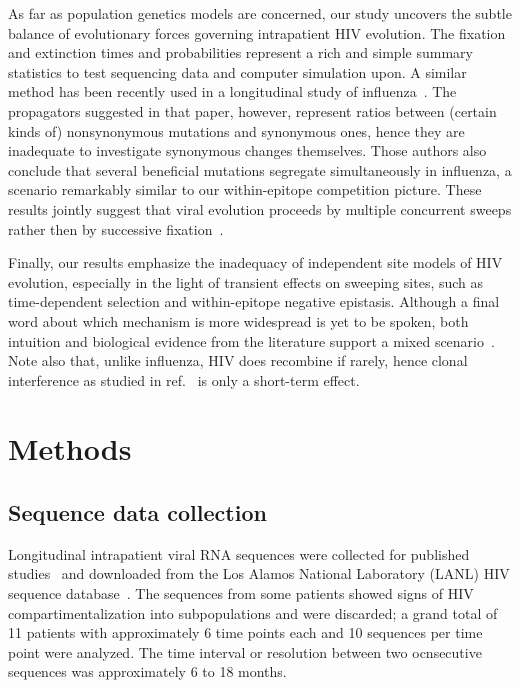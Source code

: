 \documentclass[rmp, twocolumn]{revtex4}
\begin{document}
As far as population genetics models are concerned, our study uncovers the
subtle balance of evolutionary forces governing intrapatient HIV evolution. The
fixation and extinction times and probabilities represent a rich and simple
summary statistics to test sequencing data and computer simulation upon. A
similar method has been recently used in a longitudinal study of
influenza~\citep{strelkowa_clonal_2012}. The propagators suggested in that
paper, however, represent ratios between (certain kinds of) nonsynonymous
mutations and synonymous ones, hence they are inadequate to investigate
synonymous changes themselves. Those authors also conclude that several
beneficial mutations segregate simultaneously in influenza, a scenario
remarkably similar to our within-epitope competition picture. These results
jointly suggest that viral evolution proceeds by multiple concurrent sweeps
rather then by successive fixation~\citep{desai_beneficial_2007, neher_rate_2010}.

Finally, our results emphasize the inadequacy of independent site
models of HIV evolution, especially in the light of transient effects on
sweeping sites, such as time-dependent selection and within-epitope negative
epistasis. Although a final word about which mechanism is more
widespread is yet to be spoken, both intuition and biological evidence from the
literature support a mixed scenario~\citep{richman_rapid_2003,
moore_limited_2009, bar_early_2012}. Note also that, unlike influenza, HIV does
recombine if rarely, hence clonal interference as studied in
ref.~\citep{strelkowa_clonal_2012} is only a short-term effect.

\section{Methods}
\subsection{Sequence data collection}
Longitudinal intrapatient viral RNA sequences were collected for published
studies~\citep{shankarappa_consistent_1999,
liu_selection_2006, bunnik_autologous_2008} and downloaded from the Los Alamos
National Laboratory (LANL) HIV sequence database~\citep{LANL2012}. The sequences from
some patients showed signs of HIV compartimentalization into subpopulations and
were discarded; a grand total of 11
patients with approximately 6 time points each and 10 sequences per time point
were analyzed. The time interval or resolution between two ocnsecutive sequences
was approximately 6 to 18 months.
\end{document}
